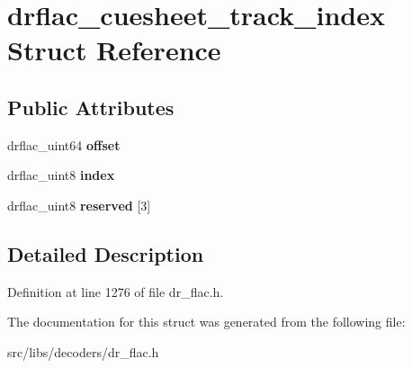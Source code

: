 \hypertarget{structdrflac__cuesheet__track__index}{\section{drflac\-\_\-cuesheet\-\_\-track\-\_\-index Struct Reference}
\label{structdrflac__cuesheet__track__index}
}
\subsection*{Public Attributes}
\begin{DoxyCompactItemize}
\item 
\hypertarget{structdrflac__cuesheet__track__index_af3941e3da8bab88be89ec9f1e87959c2}{drflac\-\_\-uint64 {\bfseries offset}}\label{structdrflac__cuesheet__track__index_af3941e3da8bab88be89ec9f1e87959c2}

\item 
\hypertarget{structdrflac__cuesheet__track__index_a46ed0cdfafd1ef1ba4e8ee5d3afb1bf3}{drflac\-\_\-uint8 {\bfseries index}}\label{structdrflac__cuesheet__track__index_a46ed0cdfafd1ef1ba4e8ee5d3afb1bf3}

\item 
\hypertarget{structdrflac__cuesheet__track__index_a2252c8071d62c2de973769b94cc191c8}{drflac\-\_\-uint8 {\bfseries reserved} \mbox{[}3\mbox{]}}\label{structdrflac__cuesheet__track__index_a2252c8071d62c2de973769b94cc191c8}

\end{DoxyCompactItemize}


\subsection{Detailed Description}


Definition at line 1276 of file dr\-\_\-flac.\-h.



The documentation for this struct was generated from the following file\-:\begin{DoxyCompactItemize}
\item 
src/libs/decoders/dr\-\_\-flac.\-h\end{DoxyCompactItemize}
